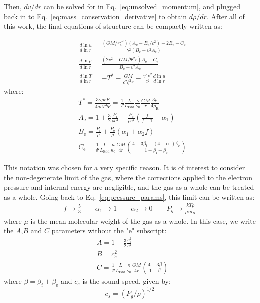\documentclass[../main.tex]{subfiles}
\newcommand{\Ae}{A_\text{e}}
\newcommand{\Be}{B_\text{e}}
\newcommand{\Ce}{C_\text{e}}
\newcommand{\Ledd}{L_\text{Edd}}
\begin{document}
Then, $dv/dr$ can be solved for in Eq.~\eqref{eq:unsolved_momentum}, and plugged back in to Eq.~\eqref{eq:mass_conservation_derivative} to obtain $d\rho/dr$. After all of this work, the final equations of structure can be compactly written as:

\begin{align}
    &\frac{d\ln u}{d\ln r}=\frac{(GM/r\zeta^2)\left(\Ae-\Be/c^2\right)-2\Be-\Ce}{\gamma^2(\Be-v^2\Ae)}\label{eq:dvdr}\\
    &\frac{d\ln\rho}{d\ln r}=\frac{\left(2v^2-GM/\Psi^2r\right)\Ae+\Ce}{\Be-v^2\Ae} \label{eq:drhodr}\\
    &\frac{d\ln T}{d\ln r}=-T^*-\frac{GM}{c^2\zeta^2r}-\frac{\gamma^2v^2}{c^2}\frac{d\ln u}{d\ln r}\label{eq:dTdr}
\end{align}
where:
\begin{align}
    \label{eq:AeBeCe_constants}
    &T^*=\frac{3\kappa\rho rF}{4acT^4\Psi}=\frac{1}{\Psi}\frac{L}{\Ledd}\frac{\kappa}{\kappa_0}\frac{GM}{r}\frac{3\rho}{4\rho_\text{R}}\nonumber\\
    &\Ae=1+\frac{3}{2}\frac{P_\text{i}}{\rho c^2}+\frac{P_\text{e}}{\rho c^2}\left(\frac{f}{f-1}-\alpha_1\right) \nonumber\\
    &\Be=\frac{P_\text{i}}{\rho}+\frac{P_\text{e}}{\rho}(\alpha_1+\alpha_2f) \nonumber \\
    &\Ce=\frac{1}{\Psi}\frac{L}{\Ledd}\frac{\kappa}{\kappa_0}\frac{GM}{4r}\left(\frac{4-3\beta_\text{i}-(4-\alpha_1)\beta_\text{e}}{1-\beta_\text{i}-\beta_\text{e}}\right)
\end{align}

This notation was chosen for a very specific reason. It is of interest to consider the non-degenerate limit of the gas, where the corrections applied to the electron pressure and internal energy are negligible, and the gas as a whole can be treated as a whole. Going back to Eq.~\eqref{eq:pressure_params}, this limit can be written as:
\begin{gather}
    f\rightarrow \frac{5}{3} \qquad \alpha_1\rightarrow 1 \qquad \alpha_2\rightarrow 0 \qquad P_g\rightarrow\frac{kT\rho}{\mu m_H} 
\end{gather}
where $\mu$ is the mean molecular weight of the gas as a whole. In this case, we write the $A$,$B$ and $C$ parameters without the "e" subscript:
\begin{align}
    \label{eq:ABC_constants}
    &A=1+\frac{3}{2}\frac{c_s^2}{c^2} \nonumber\\
    &B=c_s^2 \nonumber \\
    &C=\frac{1}{\Psi}\frac{L}{\Ledd}\frac{\kappa}{\kappa_0}\frac{GM}{4r}\left(\frac{4-3\beta}{1-\beta}\right)
\end{align}
where $\beta=\beta_i+\beta_\text{e}$ and $c_s$ is the sound speed, given by:
\begin{equation}\label{eq:cs}
    c_s=(P_g/\rho)^{1/2}
\end{equation}
\end{document}

